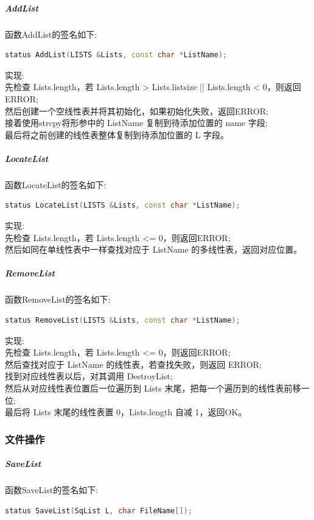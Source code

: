 \documentclass[supercite]{Experimental_Report}
\theoremstyle{definition}
\begin{document}
\subparagraph{AddList}
\noindent
函数AddList的签名如下:
\begin{lstlisting}[language=C++, frame=single]
status AddList(LISTS &Lists, const char *ListName);
\end{lstlisting}

\noindent
实现: \\
先检查 Lists.length，若 Lists.length > Lists.listsize || Lists.length < 0，则返回ERROR; \\
然后创建一个空线性表并将其初始化，如果初始化失败，返回ERROR; \\
接着使用strcpy将形参中的 ListName 复制到待添加位置的 name 字段; \\
最后将之前创建的线性表整体复制到待添加位置的 L 字段。\\

\subparagraph{LocateList}
\noindent
函数LocateList的签名如下:
\begin{lstlisting}[language=C++, frame=single]
status LocateList(LISTS &Lists, const char *ListName);
\end{lstlisting}

\noindent
实现: \\
先检查 Lists.length，若 Lists.length <= 0，则返回ERROR; \\
然后如同在单线性表中一样查找对应于 ListName 的多线性表，返回对应位置。\\

\subparagraph{RemoveList}
\noindent
函数RemoveList的签名如下:
\begin{lstlisting}[language=C++, frame=single]
status RemoveList(LISTS &Lists, const char *ListName);
\end{lstlisting}

\noindent
实现: \\
先检查 Lists.length，若 Lists.length <= 0，则返回ERROR; \\
然后查找对应于 ListName 的线性表，若查找失败，则返回 ERROR; \\
找到对应线性表以后，对其调用 DestroyList; \\
然后从对应线性表位置后一位遍历到 Lists 末尾，把每一个遍历到的线性表前移一位; \\
最后将 Lists 末尾的线性表置 0，Lists.length 自减 1，返回OK。\\

\subsubsection{文件操作}

\subparagraph{SaveList}
\noindent
函数SaveList的签名如下:
\begin{lstlisting}[language=C++, frame=single]
status SaveList(SqList L, char FileName[]);
\end{lstlisting}
\end{document}
